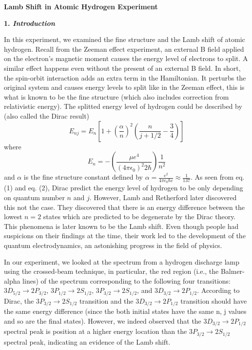 \documentclass[11pt]{article}
\begin{document}
\textbf{Lamb Shift in Atomic Hydrogen Experiment}
\bigskip

\textbf{1. \textit{Introduction}}
\smallskip

In this experiment, we examined the fine structure and the Lamb shift of atomic hydrogen. Recall from the Zeeman effect experiment, an external B field applied on the electron's magnetic moment causes the energy level of electrons to split. A similar effect happens even without the present of an external B field. In short, the spin-orbit interaction adds an extra term in the Hamiltonian. It perturbs the original system and causes energy levels to split like in the Zeeman effect, this is what is known to be the fine structure (which also includes correction from relativistic energy). The splitted energy level of hydrogen could be described by (also called the Dirac result)
\begin{equation}\label{eqn:einstein}
E_{nj} = E_n [1+(\frac{\alpha}{n})^2 (\frac{n}{j+1/2} -\frac{3}{4})]
\end{equation}
where 
\begin{equation}\label{eqn:einstein}
E_n = - (\frac{\mu e^4}{(4 \pi \epsilon_0)^2 2\hbar})\frac{1}{n^2}
\end{equation}
and $\alpha$ is the fine structure constant defined by $\alpha = \frac{e^2}{4 \pi \epsilon_0\hbar c} \approx \frac{1}{137}$. As seen from eq. (1) and eq. (2), Dirac predict the energy level of hydrogen to be only depending on quantum number $n$ and $j$. However, Lamb and Retherford later discovered this not the case. They discovered that there is an energy difference between the lowest $n = 2$ states which are predicted to be degenerate by the Dirac theory. This phenomena is later known to be the Lamb shift. Even though people had suspicions on their findings at the time, their work led to the development of the quantum electrodynamics, an astonishing progress in the field of physics.

In our experiment, we looked at the spectrum from a hydrogen discharge lamp using the crossed-beam technique, in particular, the red region (i.e., the Balmer-alpha lines) of the spectrum corresponding to the following four transitions: $3D_{5/2} \rightarrow 2P_{3/2}$, $3P_{1/2} \rightarrow 2S_{1/2}$, $3P_{3/2} \rightarrow 2S_{1/2}$, and $3D_{3/2} \rightarrow 2P_{1/2}$. According to Dirac, the $3P_{3/2} \rightarrow 2S_{1/2}$ transition and the $3D_{3/2} \rightarrow 2P_{1/2}$ transition should have the same energy difference (since the both initial states have the same n, j values and so are the final states). However, we indeed observed that the $3D_{3/2} \rightarrow 2P_{1/2}$ spectral peak is position at a higher energy location than the $3P_{3/2} \rightarrow 2S_{1/2}$ spectral peak, indicating an evidence of the Lamb shift.
\bigskip
\end{document}
